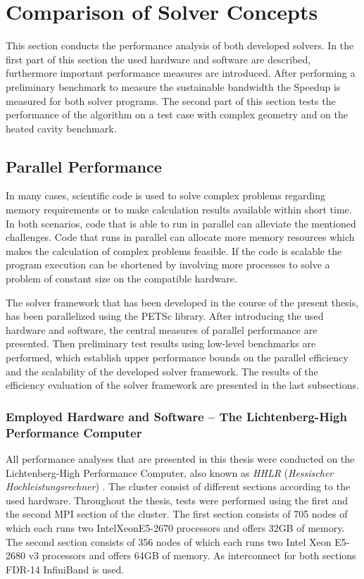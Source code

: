 \section{Comparison of Solver Concepts}
\label{sec:compare}

This section conducts the performance analysis of both developed solvers. In the first part of this section the used hardware and software are described, furthermore important performance measures are introduced. After performing a preliminary benchmark to measure the sustainable bandwidth the Speedup is measured for both solver programs. The second part of this section tests the performance of the algorithm on a test case with complex geometry and on the heated cavity benchmark.
  
\subsection{Parallel Performance}

In many cases, scientific code is used to solve complex problems regarding memory requirements or to make calculation results available within short time. In both scenarios, code that is able to run in parallel can alleviate the mentioned challenges. Code that runs in parallel can allocate more memory resources which makes the calculation of complex problems feasible. If the code is scalable the program execution can be shortened by involving more processes to solve a problem of constant size on the compatible hardware.

The solver framework that has been developed in the course of the present thesis, has been parallelized using the PETSc library. After introducing the used hardware and software, the central measures of parallel performance are presented. Then preliminary test results using low-level benchmarks are performed, which establish upper performance bounds on the parallel efficiency and the scalability of the developed solver framework. The results of the efficiency evaluation of the solver framework are presented in the last subsections.

\subsubsection{Employed Hardware and Software -- The Lichtenberg-High Performance Computer }
\label{sec:hhlr}

All performance analyses that are presented in this thesis were conducted on the Lichtenberg-High Performance Computer, also known as \emph{HHLR} (\emph{Hessischer Hochleistungsrechner}) \cite{hhlr}. The cluster consist of different sections according to the used hardware. Throughout the thesis, tests were performed using the first and the second MPI section of the cluster. The first section consists of 705 nodes of which each runs two Intel\textregistered Xeon\textregistered E5-2670 processors and offers 32GB of memory. The second section consists of 356 nodes of which each runs two Intel Xeon E5-2680 v3 processors and offers 64GB of memory. As interconnect for both sections FDR-14 InfiniBand is used.

